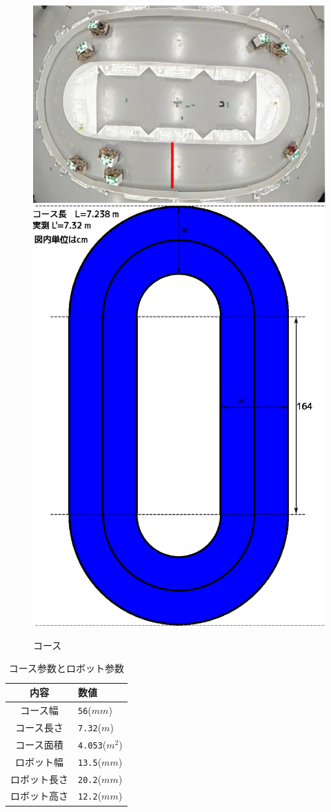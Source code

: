 \documentclass[twocolumn]{jarticle} %
\begin{document}
\begin{figure}[htb]
\centering
\includegraphics[width=0.5\linewidth]{course1.jpg}
\includegraphics[width=0.5\linewidth]{pic/Oval.eps}
\caption{
コース
}
\label{fig_dummy}
\end{figure}


\begin{table}[!htb]
\begin{center}
\begin{tabular}{|cl|}
\hline
内容 &  数値\\
\hline
コース幅 & \verb|56|($mm$) \\
コース長さ & \verb|7.32|($m$) \\
コース面積 & \verb|4.053|($m^2$) \\
ロボット幅 & \verb|13.5|($mm$) \\
ロボット長さ & \verb|20.2|($mm$) \\
ロボット高さ & \verb|12.2|($mm$) \\
\hline
\end{tabular}
\end{center}
\caption{
コース参数とロボット参数
}
\end{table}
\end{document}
